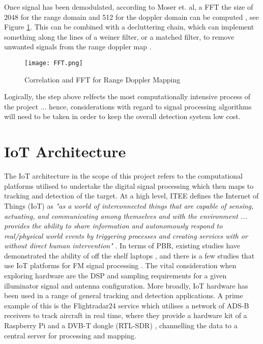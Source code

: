 \par \vspace{0.5cm} 
\noindent Once signal has been demodulated, according to Moser et. al, a FFT the size of 2048 for the range domain and 512 for the doppler domain can be computed \cite{IOTpassiveRadar}, see Figure \ref{fig:FFT}. This can be combined with a decluttering chain, which can implement something along the lines of a weiner filter, or a matched filter, to remove unwanted signals from the range doppler map \cite{FundamentalsPassiveRadar}.

\begin{figure}[htbp]
    \centering
    \texttt{[image: FFT.png]}
    \caption{Correlation and FFT for Range Doppler Mapping \cite{IOTpassiveRadar}}
    \label{fig:FFT}
\end{figure}

\noindent Logically, the step above relfects the most computationally intensive process of the project ... hence, considerations with regard to signal processing algorithms will need to be taken in order to keep the overall detection system low cost. 



\section{IoT Architecture}

The IoT architecture in the scope of this project refers to the computational platforms utilised to undertake the digital signal processing which then maps to tracking and detection of the target. At a high level, ITEE defines the Internet of Things (IoT) as \textit{"as a world of interconnected things that are capable of sensing, actuating, and communicating among themselves and with the environment ... provides the ability to share information and autonomously respond to real/physical world events by triggering processes and creating services with or without direct human intervention"} \cite{IoTdefinition}. In terms of PBR, existing studies have demonstrated the ability of off the shelf laptops \cite{FMlowCost}, and there is a few studies that use IoT platforms for FM signal processing \cite{IOTpassiveRadar}. The vital consideration when exploring hardware are the DSP and sampling requirements for a given illuminator signal and antenna configuration. More broadly, IoT hardware has been used in a range of general tracking and detection applications. A prime example of this is the Flightradar24 service which utilises a network of ADS-B receivers to track aircraft in real time, where they provide a hardware kit of a Raspberry Pi and a DVB-T dongle (RTL-SDR) \cite{flightradar24}, channelling the data to a central server for processing and mapping. 

